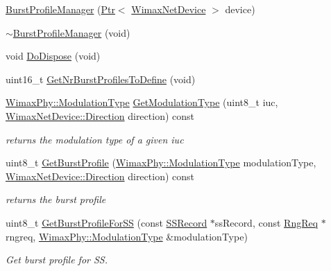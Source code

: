 \begin{DoxyCompactItemize}
\item 
\hyperlink{classns3_1_1BurstProfileManager_a2bb8cce57096cc40829f6766bac0f5e2}{Burst\+Profile\+Manager} (\hyperlink{classns3_1_1Ptr}{Ptr}$<$ \hyperlink{classns3_1_1WimaxNetDevice}{Wimax\+Net\+Device} $>$ device)
\item 
\hyperlink{classns3_1_1BurstProfileManager_a33d7cf7ae72315be3a4b3938df2edfaf}{$\sim$\+Burst\+Profile\+Manager} (void)
\item 
void \hyperlink{classns3_1_1BurstProfileManager_a15ee536bdc5c6fe5f0c011cac500cdc9}{Do\+Dispose} (void)
\item 
uint16\+\_\+t \hyperlink{classns3_1_1BurstProfileManager_a2183d2a2a87bade60a490b83cb7bf03d}{Get\+Nr\+Burst\+Profiles\+To\+Define} (void)
\item 
\hyperlink{classns3_1_1WimaxPhy_a044c5d8a48ca992c39c2a946f6e755fa}{Wimax\+Phy\+::\+Modulation\+Type} \hyperlink{classns3_1_1BurstProfileManager_a73c518ce35091cb41b389a299620cc3a}{Get\+Modulation\+Type} (uint8\+\_\+t iuc, \hyperlink{classns3_1_1WimaxNetDevice_a194b6cf7eb59582328eb2531dc9ed884}{Wimax\+Net\+Device\+::\+Direction} direction) const 
\begin{DoxyCompactList}\small\item\em returns the modulation type of a given iuc \end{DoxyCompactList}\item 
uint8\+\_\+t \hyperlink{classns3_1_1BurstProfileManager_aa3b3f6cd2381f9620379083f84605231}{Get\+Burst\+Profile} (\hyperlink{classns3_1_1WimaxPhy_a044c5d8a48ca992c39c2a946f6e755fa}{Wimax\+Phy\+::\+Modulation\+Type} modulation\+Type, \hyperlink{classns3_1_1WimaxNetDevice_a194b6cf7eb59582328eb2531dc9ed884}{Wimax\+Net\+Device\+::\+Direction} direction) const 
\begin{DoxyCompactList}\small\item\em returns the burst profile \end{DoxyCompactList}\item 
uint8\+\_\+t \hyperlink{classns3_1_1BurstProfileManager_a23f0b08e555af41ab33d916501b8d5b8}{Get\+Burst\+Profile\+For\+SS} (const \hyperlink{classns3_1_1SSRecord}{S\+S\+Record} $\ast$ss\+Record, const \hyperlink{classns3_1_1RngReq}{Rng\+Req} $\ast$rngreq, \hyperlink{classns3_1_1WimaxPhy_a044c5d8a48ca992c39c2a946f6e755fa}{Wimax\+Phy\+::\+Modulation\+Type} \&modulation\+Type)
\begin{DoxyCompactList}\small\item\em Get burst profile for SS. \end{DoxyCompactList}\item 

\end{DoxyCompactItemize}
